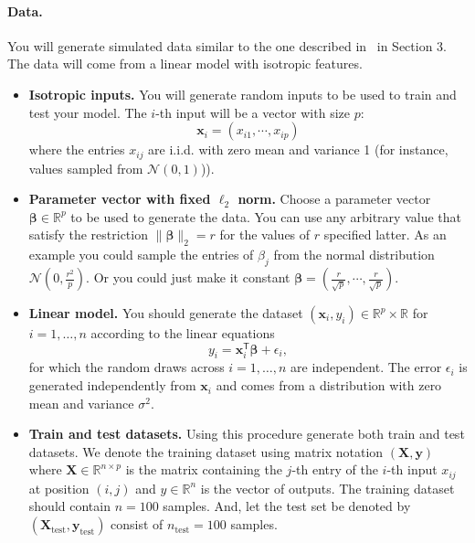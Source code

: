 \documentclass[a4paper,10pt]{article}
\newcommand{\trnsp}{\mathsf{T}}
\newcommand{\R}{\mathbb{R}}
\begin{document}
\paragraph{Data.} You will generate simulated data similar to the one described in~\citep{hastie_surprises_2019} in Section 3. The data will come from a linear model with isotropic features. 
\begin{itemize}
    \item \textbf{Isotropic inputs.} You will generate random inputs to be used to train and test your model. The $i$-th input will be a vector with size $p$:
    \[\textbf{x}_{i} = (x_{i1}, \cdots, x_{ip})\]
    where the entries $x_{ij}$ are i.i.d. with zero mean and variance 1 (for instance, values sampled from ${\mathcal{N}(0, 1)}$)).
    \item \textbf{Parameter vector with fixed $\ell_2$ norm.} Choose a parameter vector $\boldsymbol{\beta} \in \R^p$ to be used to generate the data. You can use any arbitrary value that satisfy the restriction $\|\boldsymbol{\beta}\|_2=r$ for the values of $r$ specified latter. As an example you could sample the entries of $\beta_j$ from the normal distribution $\mathcal{N}(0, \frac{r^2}{p})$. Or you could just make it constant $\boldsymbol{\beta} = \left(\frac{r}{\sqrt{p}}, \cdots, \frac{r}{\sqrt{p}}\right)$.
    \item \textbf{Linear model.} You should generate the dataset $(\textbf{x}_i, y_i) \in \R^p \times \R$ for $i=1, \dots, n$ according to the linear equations
    \begin{equation}
        y_i = \textbf{x}_i^\trnsp \boldsymbol{\beta} + \epsilon_i, \label{eq:data-model}
    \end{equation}
    for which the random draws across $i = 1, \dots, n$ are independent.  The error $\epsilon_i$ is generated independently from $\textbf{x}_i$ and comes from a distribution with zero mean and variance $\sigma^2$.
    \item \textbf{Train and test datasets.} Using this procedure generate both train and test datasets. We denote the training dataset using matrix notation $(\textbf{X}, \textbf{y})$ where $\textbf{X} \in \R^{n \times p} $ is the matrix containing the $j$-th entry of the $i$-th input $x_{ij}$ at position $(i, j)$ and $y \in \R^n$ is the vector of outputs. The training dataset should contain $n = 100$ samples. And, let the test set be denoted by $(\textbf{X}_{\text{test}}, \textbf{y}_{\text{test}})$ consist of $n_{\text{test}} = 100$  samples.
\end{itemize}
\end{document}
